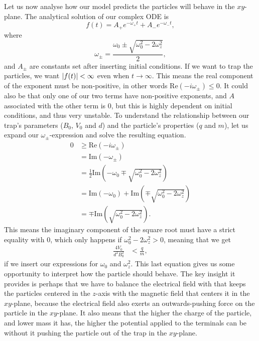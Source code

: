 Let us now analyse how our model predicts the particles will behave in the $xy$-plane. The analytical solution of our complex ODE is 
%
\begin{equation*}
f(t) = A_+e^{-\omega_+ t} + A_-e^{-\omega_- t},
\end{equation*}
%
where
\begin{equation*}
\omega_\pm = \frac{\omega_0 \pm \sqrt{\omega_0^2 - 2 \omega_z^2}}{2},
\end{equation*}
and $A_\pm$ are constants set after inserting initial conditions.
%
If we want to trap the particles, we want $\abs{f(t)} < \infty$ even when $t \to \infty$. This means the real component of the exponent must be non-positive, in other words $\text{Re}(-i\omega_\pm) \leq 0$. It could also be that only one of our two terms have non-positive exponents, and $A$ associated with the other term is $0$, but this is highly dependent on initial conditions, and thus very unstable. To understand the relationship between our trap's parameters ($B_0$, $V_0$ and $d$) and the particle's properties ($q$ and $m$), let us expand our $\omega_\pm$-expression and solve the resulting equation.
%
\begin{align*}
0 &\geq \text{Re} \left(-i \omega_\pm \right) \\
  &= \text{Im} \left(- \omega_\pm \right) \\
  &= \frac{1}{2} \text{Im} \left(- \omega_0 \mp \sqrt{\omega_0^2 - 2 \omega_z^2} \right) \\
  &= \text{Im} \left(- \omega_0 \right) + \text{Im} \left( \mp \sqrt{\omega_0^2 - 2 \omega_z^2} \right) \\
  &= \mp \text{Im} \left( \sqrt{\omega_0^2 - 2 \omega_z^2} \right).
\end{align*}
%
This means the imaginary component of the square root must have a strict equality with $0$, which only happens if $\omega_0^2 - 2 \omega_z^2 > 0$, meaning that we get
%
\begin{align*}
\frac{4V_0}{d^2 B_0^2} &< \frac{q}{m},
\end{align*}
%
if we insert our expressions for $\omega_0$ and $\omega_z^2$. This last equation gives us some opportunity to interpret how the particle should behave. The key insight it provides is perhaps that we have to balance the electrical field with that keeps the particles centered in the $z$-axis with the magnetic field that centers it in the $xy$-plane, because the electrical field also exerts an outwards-pushing force on the particle in the $xy$-plane. It also means that the higher the charge of the particle, and lower mass it has, the higher the potential applied to the terminals can be without it pushing the particle out of the trap in the $xy$-plane.

